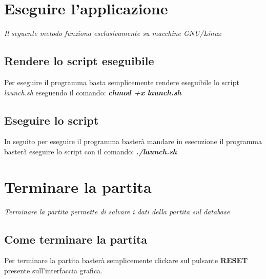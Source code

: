 \documentclass{article}
\begin{document}
\newpage
\section{Eseguire l'applicazione}
\emph{Il seguente metodo funziona esclusivamente su macchine GNU/Linux}

\subsection{Rendere lo script eseguibile}
Per eseguire il programma basta semplicemente rendere eseguibile lo script \emph{launch.sh}
eseguendo il comando: \textbf{\emph{chmod +x launch.sh}}

\subsection{Eseguire lo script}
In seguito per eseguire il programma basterà mandare in esecuzione il programma 
basterà eseguire lo script con il comando: \textbf{\emph{./launch.sh}}

\newpage
\section{Terminare la partita}
\emph{Terminare la partita permette di salvare i dati della partita sul database}

\subsection{Come terminare la partita}
Per terminare la partita basterà semplicemente clickare sul pulsante \textbf{RESET}
presente sull'interfaccia grafica.
\end{document}
